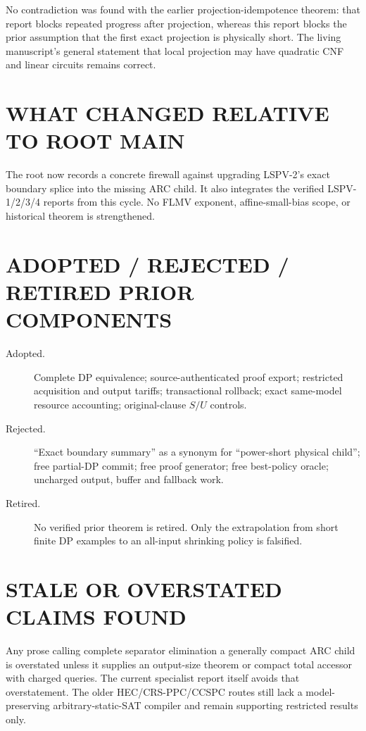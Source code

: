 \documentclass[11pt]{article}
\begin{document}
No contradiction was found with the earlier projection-idempotence theorem:
that report blocks repeated progress after projection, whereas this report
blocks the prior assumption that the first exact projection is physically
short.  The living manuscript's general statement that local projection may
have quadratic CNF and linear circuits remains correct.

\section{WHAT CHANGED RELATIVE TO ROOT MAIN}
The root now records a concrete firewall against upgrading LSPV-2's exact
boundary splice into the missing ARC child.  It also integrates the verified
LSPV-1/2/3/4 reports from this cycle.  No FLMV exponent, affine-small-bias
scope, or historical theorem is strengthened.

\section{ADOPTED / REJECTED / RETIRED PRIOR COMPONENTS}
\begin{description}
\item[Adopted.] Complete DP equivalence; source-authenticated proof export;
restricted acquisition and output tariffs; transactional rollback; exact
same-model resource accounting; original-clause $S/U$ controls.
\item[Rejected.] ``Exact boundary summary'' as a synonym for ``power-short
physical child''; free partial-DP commit; free proof generator; free best-policy
oracle; uncharged output, buffer and fallback work.
\item[Retired.] No verified prior theorem is retired.  Only the extrapolation
from short finite DP examples to an all-input shrinking policy is falsified.
\end{description}

\section{STALE OR OVERSTATED CLAIMS FOUND}
Any prose calling complete separator elimination a generally compact ARC child
is overstated unless it supplies an output-size theorem or compact total
accessor with charged queries.  The current specialist report itself avoids
that overstatement.  The older HEC/CRS-PPC/CCSPC routes still lack a
model-preserving arbitrary-static-SAT compiler and remain supporting restricted
results only.
\end{document}

